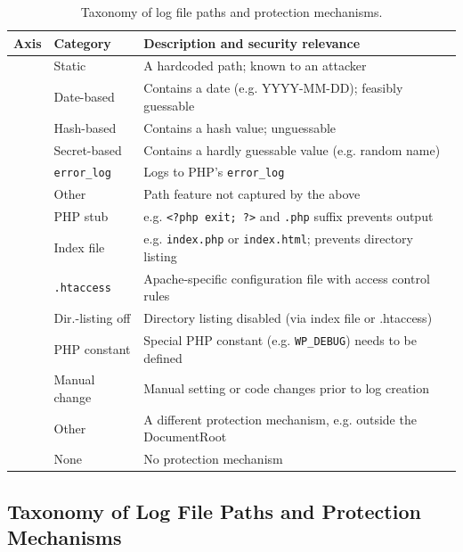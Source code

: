 \documentclass[sigconf]{acmart}
\begin{document}
\begin{table}[t]
\centering
\caption{Taxonomy of log file paths and protection mechanisms.} 
\label{tab:taxonomy}
\renewcommand{\arraystretch}{0.95}
\begin{tabularx}{\linewidth}{@{}l l X@{}}
\toprule
\textbf{Axis} & \textbf{Category} & \textbf{Description and security relevance} \\
\midrule
{}
 & Static      & A hardcoded path; known to an attacker \\
 & Date-based  & Contains a date (e.g. YYYY-MM-DD); feasibly guessable \\
 & Hash-based  & Contains a hash value; unguessable \\
 & Secret-based      & Contains a hardly guessable value (e.g. random name) \\
 & \texttt{error\_log} & Logs to PHP's \texttt{error\_log} \\
 & Other       & Path feature not captured by the above \\
\midrule
{}
 & PHP stub        & e.g. \texttt{<?php exit; ?>} and \texttt{.php} suffix prevents output \\
 & Index file      & e.g. \texttt{index.php} or \texttt{index.html}; prevents directory listing \\
 & \texttt{.htaccess}       & Apache-specific configuration file with access control rules \\
 & Dir.-listing off & Directory listing disabled (via index file or .htaccess) \\ 
 & PHP constant    & Special PHP constant (e.g. \texttt{WP\_DEBUG}) needs to be defined \\
 & Manual change & Manual setting or code changes prior to log creation\\
 & Other    & A different protection mechanism, e.g. outside the DocumentRoot \\
& None & No protection mechanism \\
 \bottomrule
\end{tabularx}
\end{table}
\subsection{Taxonomy of Log File Paths and Protection Mechanisms}
\end{document}
